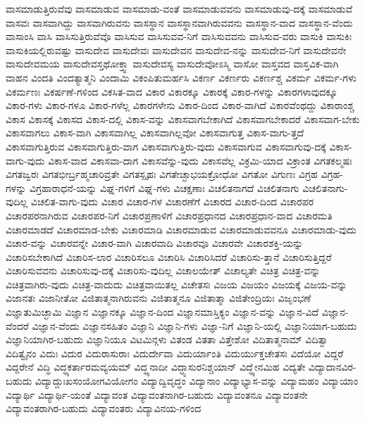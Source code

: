 {ವಾಸಮಾಡುತ್ತಿರುವೆವು
ವಾಸಮಾಡುವ
ವಾಸಮಾಡು-ವಂತೆ
ವಾಸಮಾಡುವವನು
ವಾಸಮಾಡುವು-ದಕ್ಕೆ
ವಾಸಮಾಡುವೆ
ವಾಸವಃ
ವಾಸವಾಗಿದ್ದು
ವಾಸವಾಗಿರುವನು
ವಾಸಸ್ಥಾನ
ವಾಸಸ್ಥಾನವಾಗಿರುವವನು
ವಾಸಸ್ಥಾನ-ವಾದ
ವಾಸಸ್ಥಾನ-ವೆಂದು
ವಾಸಾಂಸಿ
ವಾಸಿ
ವಾಸಿಸುತ್ತಿರುವೆವೊ
ವಾಸಿಸುವ
ವಾಸಿಸುವವ-ನಿಗೆ
ವಾಸಿಸುವವನು
ವಾಸಿಸುವ-ವರು
ವಾಸುಕಿ
ವಾಸುಕಿಃ
ವಾಸುಕಿಯಲ್ಲಿರುವಷ್ಟು
ವಾಸುದೇವ
ವಾಸುದೇವಃ
ವಾಸುದೇವನ
ವಾಸುದೇವ-ನನ್ನು
ವಾಸುದೇವ-ನಿಗೆ
ವಾಸುದೇವನೇ
ವಾಸುದೇವಮಯ
ವಾಸುದೇವಸ್ತಥೋಕ್ತ್ವಾ
ವಾಸುದೇವಸ್ಯ
ವಾಸುದೇವೋಽಸ್ಮಿ
ವಾಸೋ
ವಾಸ್ತವದ
ವಾಸ್ತವಿಕ-ವಾಗಿ
ವಾಹನ
ವಿಂದತಿ
ವಿಂದತ್ಯಾತ್ಮನಿ
ವಿಂದಾಮಿ
ವಿಕಂಪಿತುಮರ್ಹಸಿ
ವಿಕರ್ಣ
ವಿಕರ್ಣರು
ವಿಕರ್ಣಶ್ಚ
ವಿಕರ್ಮ
ವಿಕರ್ಮ-ಗಳು
ವಿಕರ್ಮಣಃ
ವಿಕರ್ಷಣೆ-ಗಳಿಂದ
ವಿಕಸಿತ-ವಾದ
ವಿಕಾರ
ವಿಕಾರಕ್ಕೂ
ವಿಕಾರಕ್ಕೆ
ವಿಕಾರ-ಗಳನ್ನು
ವಿಕಾರಗಳಾವುದಕ್ಕೂ
ವಿಕಾರ-ಗಳು
ವಿಕಾರ-ಗಳೂ
ವಿಕಾರ-ಗಳೆಲ್ಲ
ವಿಕಾರಗಳೇನು
ವಿಕಾರ-ದಿಂದ
ವಿಕಾರ-ವಾಗಿದೆ
ವಿಕಾರವೆಂಥದ್ದು
ವಿಕಾರಾಂಶ್ಚ
ವಿಕಾಸ
ವಿಕಾಸಕ್ಕೆ
ವಿಕಾಸದ
ವಿಕಾಸ-ದಲ್ಲಿ
ವಿಕಾಸ-ವನ್ನು
ವಿಕಾಸವಾಗಬೇಕಾಗಿದೆ
ವಿಕಾಸವಾಗಬೇಕಾದರೆ
ವಿಕಾಸವಾಗ-ಬೇಕು
ವಿಕಾಸವಾಗಲು
ವಿಕಾಸ-ವಾಗಿ
ವಿಕಾಸವಾಗಿಲ್ಲ
ವಿಕಾಸವಾಗಿಲ್ಲವೋ
ವಿಕಾಸವಾಗುತ್ತ
ವಿಕಾಸ-ವಾಗು-ತ್ತದೆ
ವಿಕಾಸವಾಗುತ್ತಿರುವ
ವಿಕಾಸವಾಗುತ್ತಿರು-ವಾಗ
ವಿಕಾಸವಾಗುತ್ತಿರು-ವುದು
ವಿಕಾಸವಾಗುವ
ವಿಕಾಸವಾಗುವು-ದಕ್ಕೆ
ವಿಕಾಸ-ವಾಗು-ವುದು
ವಿಕಾಸ-ವಾದ
ವಿಕಾಸವಾ-ದಾಗ
ವಿಕಾಸವೆನ್ನು-ವುದು
ವಿಕಾಸವೆಲ್ಲ
ವಿಕ್ರಮಿ-ಯಾದ
ವಿಕ್ರಾಂತ
ವಿಗತಕಲ್ಮಷಃ
ವಿಗತಜ್ವರಃ
ವಿಗತಭೀರ್ಬ್ರಹ್ಮಚಾರಿವ್ರತೇ
ವಿಗತಸ್ಪೃಹಃ
ವಿಗತೇಚ್ಛಾಭಯಕ್ರೋಧೋ
ವಿಗತೋ
ವಿಗುಣಃ
ವಿಗ್ರಹ
ವಿಗ್ರಹ-ಗಳನ್ನು
ವಿಗ್ರಹಾರಾಧನೆ-ಯನ್ನು
ವಿಘ್ನ-ಗಳಿಗೆ
ವಿಘ್ನ-ಗಳು
ವಿಚಕ್ಷಣಾಃ
ವಿಚಲಿತನಾಗದೆ
ವಿಚಲಿತನಾಗು
ವಿಚಲಿತನಾಗು-ವುದಿಲ್ಲ
ವಿಚಲಿತ-ವಾಗು-ವುದು
ವಿಚಾರ
ವಿಚಾರ-ಗಳ
ವಿಚಾರಣೆಗೆ
ವಿಚಾರದ
ವಿಚಾರ-ದಿಂದ
ವಿಚಾರಪರ
ವಿಚಾರಪರನಾಗಿರುವ
ವಿಚಾರಪರ-ನಿಗೆ
ವಿಚಾರಪ್ರಣಾಳಿಗೆ
ವಿಚಾರಪ್ರಧಾನದ
ವಿಚಾರಪ್ರಧಾನ-ವಾದ
ವಿಚಾರಮತಿ
ವಿಚಾರಮಾಡದೆ
ವಿಚಾರಮಾಡ-ಬೇಕು
ವಿಚಾರಮಾಡಿ
ವಿಚಾರಮಾಡುವ
ವಿಚಾರಮಾಡುವವನೂ
ವಿಚಾರಮಾಡು-ವುದು
ವಿಚಾರ-ವನ್ನು
ವಿಚಾರವನ್ನೇ
ವಿಚಾರ-ವಾಗಿ
ವಿಚಾರವಾದಿ
ವಿಚಾರವೂ
ವಿಚಾರವೇ
ವಿಚಾರಶಕ್ತಿ-ಯನ್ನು
ವಿಚಾರಿಸಬೇಕಾಗಿದೆ
ವಿಚಾರಿಸ-ಲಾರ
ವಿಚಾರಿಸಲೂ
ವಿಚಾರಿಸಿ
ವಿಚಾರಿಸಿದರೆ
ವಿಚಾರಿಸು-ತ್ತಾನೆ
ವಿಚಾರಿಸುತ್ತಿದ್ದರೆ
ವಿಚಾರಿಸುವವನು
ವಿಚಾರಿಸುವು-ದಕ್ಕೆ
ವಿಚಾರಿಸು-ವುದಿಲ್ಲ
ವಿಚಾಲಯೇತ್
ವಿಚಾಲ್ಯತೇ
ವಿಚಿತ್ರ
ವಿಚಿತ್ರ-ವನ್ನು
ವಿಚಿತ್ರವಾಗಿರು-ವುದು
ವಿಚಿತ್ರ-ವಾದುದು
ವಿಚಿತ್ರವಾಯಿತಲ್ಲ
ವಿಚೇತಸಃ
ವಿಜಯ
ವಿಜಯಂ
ವಿಜಯಕ್ಕೆ
ವಿಜಯ-ವನ್ನು
ವಿಜಾನತಃ
ವಿಜಾನೀತೋ
ವಿಜಿತಾತ್ಮನಾಗಿರುವನು
ವಿಜಿತಾತ್ಮನೂ
ವಿಜಿತಾತ್ಮಾ
ವಿಜಿತೇಂದ್ರಿಯಃ
ವಿಜೃಂಭಣೆ
ವಿಜ್ಞಾತುಮಿಚ್ಛಾಮಿ
ವಿಜ್ಞಾನ
ವಿಜ್ಞಾನಕ್ಕೂ
ವಿಜ್ಞಾನ-ದಿಂದ
ವಿಜ್ಞಾನಮಾಸ್ತಿಕ್ಯಂ
ವಿಜ್ಞಾನ-ವನ್ನು
ವಿಜ್ಞಾನ-ವಿದೆ
ವಿಜ್ಞಾನ-ವೆಂದರೆ
ವಿಜ್ಞಾನ-ವೆಂದು
ವಿಜ್ಞಾನಸಹಿತಂ
ವಿಜ್ಞಾನಿ
ವಿಜ್ಞಾನಿ-ಗಳು
ವಿಜ್ಞಾ-ನಿಗೆ
ವಿಜ್ಞಾನಿ-ಯಲ್ಲಿ
ವಿಜ್ಞಾನಿಯಾಗ-ಬಹುದು
ವಿಜ್ಞಾನಿಯಾಗಿರ-ಬಹುದು
ವಿಜ್ಞಾನಿಯೂ
ವಿಟಮಿನ್ಗಳು
ವಿತಂಡ
ವಿತತಾ
ವಿತ್ತೇಶೋ
ವಿದಿತಾತ್ಮನಾಮ್
ವಿದಿತ್ವಾ
ವಿದಿತ್ವೈನಂ
ವಿದುಃ
ವಿದುರ
ವಿದುರಾಸುರಾಃ
ವಿದುರ್ದೇವಾ
ವಿದುರ್ಯಾಂತಿ
ವಿದುರ್ಯುಕ್ತಚೇತಸಃ
ವಿದೆಯೋ
ವಿದ್ದರೆ
ವಿದ್ದರೇನೆ
ವಿದ್ಧಿ
ವಿದ್ಧ್ಯಕರ್ತಾರಮವ್ಯಯಮ್
ವಿದ್ಧ್ಯನಾದೀ
ವಿದ್ಧ್ಯಾಸುರನಿಶ್ಚಯಾನ್
ವಿದ್ಧ್ಯೇನಮಿಹ
ವಿದ್ಯತೇ
ವಿದ್ಯಾದಾನವಿರ-ಬಹುದು
ವಿದ್ಯಾದ್ದುಃಖಸಂಯೋಗವಿಯೋಗಂ
ವಿದ್ಯಾದ್ವಿವೃದ್ಧಂ
ವಿದ್ಯಾನಾಂ
ವಿದ್ಯಾಭ್ಯಾಸ-ವನ್ನು
ವಿದ್ಯಾಮಹಂ
ವಿದ್ಯಾಯಾಂ
ವಿದ್ಯಾರ್ಥಿ
ವಿದ್ಯಾರ್ಥಿ-ಯಂತೆ
ವಿದ್ಯಾವಂತ
ವಿದ್ಯಾವಂತನಾಗಿರ-ಬಹುದು
ವಿದ್ಯಾವಂತನೂ
ವಿದ್ಯಾವಂತನೇ
ವಿದ್ಯಾವಂತರಾಗಿರ-ಬಹುದು
ವಿದ್ಯಾವಂತರು
ವಿದ್ಯಾವಿನಯ-ಗಳಿಂದ
}
